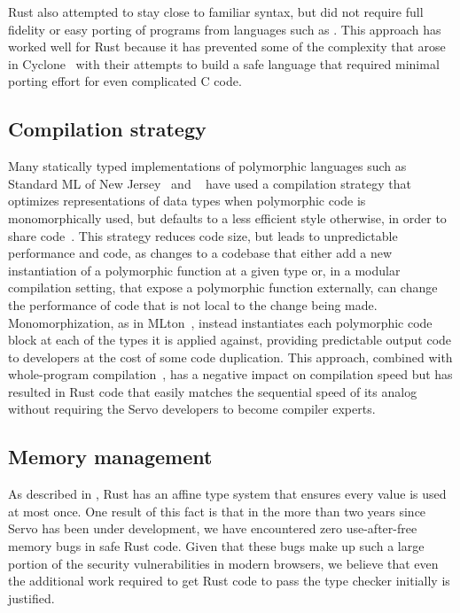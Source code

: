 Rust also attempted to stay close to familiar syntax, but did not require full fidelity or easy porting of
programs from languages such as \Cplusplus{}.
This approach has worked well for Rust because it has prevented some of the complexity that arose in
Cyclone~\cite{cyclone} with their attempts to build a safe language that required minimal porting effort
for even complicated C code.

\subsection{Compilation strategy}
Many statically typed implementations of polymorphic languages such as Standard ML of New Jersey~\cite{SMLNJ} and
\ocaml{}~\cite{ocaml-manual-3.0} have used a compilation strategy that optimizes representations of data types when
polymorphic code is monomorphically used, but defaults to a less efficient style otherwise, in order to share
code~\cite{ocaml-repr}.
This strategy reduces code size, but leads to unpredictable performance and code, as changes to a codebase that
either add a new instantiation of a polymorphic function at a given type or, in a modular compilation setting, that
expose a polymorphic function externally, can change the performance of code that is not local to the change being
made.
Monomorphization, as in MLton~\cite{mlton-compiler}, instead instantiates each polymorphic code block at each of the types
it is applied against, providing predictable output code to developers at the cost of some code duplication.
This approach, combined with whole-program compilation~\cite{weeks:whole-program-mlton}, has a negative impact on
compilation speed but has resulted in Rust code that easily matches the sequential speed of its \Cplusplus{} analog
without requiring the Servo developers to become compiler experts.

\subsection{Memory management}
As described in , Rust has an affine type system that ensures every value is used at
most once.
One result of this fact is that in the more than two years since Servo has been under development, we have
encountered zero use-after-free memory bugs in safe Rust code.
Given that these bugs make up such a large portion of the security vulnerabilities in modern browsers,
we believe that even the additional work required to get Rust code to pass the type checker initially is
justified.

